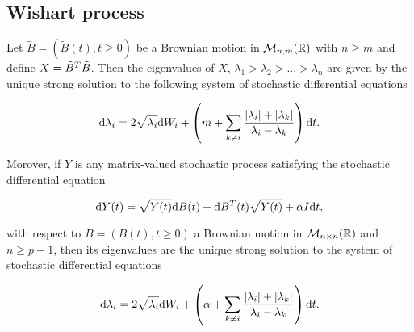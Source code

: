 \subsection{Wishart process}





\begin{corollary}
    Let $\tilde B = (\tilde B(t), t\ge 0)$ be a Brownian motion in $\mathcal M_{n,m}(\mathbb R)$ with $n\ge m$ and define $X = \tilde B^T\tilde B$. Then the eigenvalues of $X$, $\lambda_1 > \lambda_2 > ... > \lambda_n$ are given by the unique strong solution to the following system of stochastic differential equations

    \begin{equation*}
        \mathrm d \lambda_i = 2 \sqrt{\lambda_i} \mathrm d W_i + \left(m + \sum_{k\neq i} \frac{\lvert \lambda_i \rvert + \lvert \lambda_k \rvert}{ \lambda_i - \lambda_k} \right) \mathrm d t.
    \end{equation*}

    Morover, if $Y$ is any matrix-valued stochastic process satisfying the stochastic differential equation

    \begin{equation*}
        \mathrm d Y(t) = \sqrt{Y(t)} \mathrm d B(t) + \mathrm d B^T(t) \sqrt{Y(t)} + \alpha I \mathrm d t,
    \end{equation*}

    with respect to $B = (B(t), t \ge 0)$ a Brownian motion in $\mathcal M_{n\times n}(\mathbb R)$ and $n\ge p-1$, then its eigenvalues are the unique strong solution to the system of stochastic differential equations

    \begin{equation} \label{eq:wishart}
        \mathrm d \lambda_i = 2 \sqrt{\lambda_i} \mathrm d W_i + \left(\alpha + \sum_{k\neq i} \frac{\lvert \lambda_i \rvert + \lvert \lambda_k \rvert}{ \lambda_i - \lambda_k} \right) \mathrm d t.
    \end{equation}

\end{corollary}

